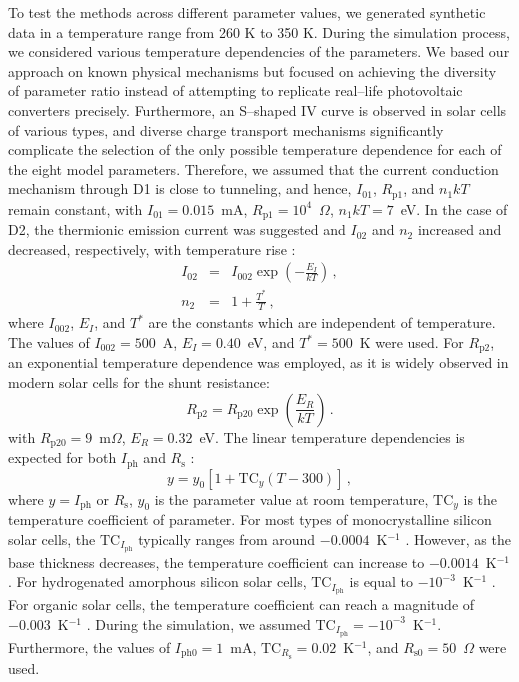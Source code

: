 \documentclass[a4paper,fleqn]{cas-dc}
\begin{document}
To test the methods across different parameter values, we generated synthetic data in a temperature range from 260 K to 350 K.
During the simulation process, we considered various temperature dependencies of the parameters.
We based our approach on known physical mechanisms but focused on achieving the diversity of parameter ratio
instead of attempting to replicate real--life photovoltaic converters precisely.
Furthermore, an S--shaped IV curve is observed in solar cells of various types,
and diverse charge transport mechanisms significantly complicate the selection of
the only possible temperature dependence for each of the eight model parameters.
Therefore, we assumed that the current conduction mechanism through D1 is close to tunneling,
and hence, $I_{01}$, $R_\mathrm{p1}$, and $n_1kT$ remain constant,
with $I_{01}=0.015$~mA, $R_\mathrm{p1}=10^4$~$\Omega$, $n_1kT=7$~eV.
In the case of D2, the thermionic emission current was suggested
and $I_{02}$ and $n_2$ increased and decreased, respectively, with temperature rise \cite{Sze2012}:
\begin{eqnarray}
I_{02}&=& I_{002}\exp\left(-\frac{E_I}{kT}\right)\,,\\
n_2&=&1+\frac{T^*}{T}\,,
\end{eqnarray}
where $I_{002}$, $E_I$, and $T^*$ are the constants which are independent of temperature.
The values of $I_{002}=500$~A, $E_I=0.40$~eV, and $T^*=500$~K were used.
For $R_\mathrm{p2}$, an exponential temperature dependence was employed,
as it is widely observed \cite{Kondratenko2019} in modern solar cells for the shunt resistance:
\begin{equation}
R_\mathrm{p2}=R_\mathrm{p20}\exp\left(\frac{E_R}{kT}\right)\,.
\end{equation}
with
$R_\mathrm{p20}=9$~m$\Omega$,
$E_R=0.32$~eV.
The linear temperature dependencies is expected for both $I_\mathrm{ph}$ \cite{Green2003,Eberle2021} and $R_\mathrm{s}$ \cite{Ibrahim2017,Bradaschia2019}:
\begin{equation}
y=y_{0}[1+\mathrm{TC}_y(T-300)]\,,
\end{equation}
where
$y=I_\mathrm{ph}$ or $R_\mathrm{s}$,
$y_0$ is the parameter value at room temperature,
$\mathrm{TC}_y$ is the temperature coefficient of parameter.
For most types of monocrystalline silicon solar cells, the $\mathrm{TC}_{I_\mathrm{ph}}$ typically ranges from around $-0.0004$~K$^{-1}$ \cite{TuanLe2021}.
However, as the base thickness decreases, the temperature coefficient can increase to $-0.0014$~K$^{-1}$ \cite{Dupre2016}.
For hydrogenated amorphous silicon solar cells, $\mathrm{TC}_{I_\mathrm{ph}}$ is equal to $-10^{-3}$~K$^{-1}$ \cite{Riesen2016}.
For organic solar cells, the temperature coefficient can reach a magnitude of $-0.003$~K$^{-1}$ \cite{Rana2018}.
During the simulation, we assumed $\mathrm{TC}_{I_\mathrm{ph}}=-10^{-3}$~K$^{-1}$.
Furthermore, the values of $I_\mathrm{ph0}=1$~mA,
$\mathrm{TC}_{R_\mathrm{s}}=0.02$~K$^{-1}$,
and $R_\mathrm{s0}=50$~$\Omega$ were used.
\end{document}
